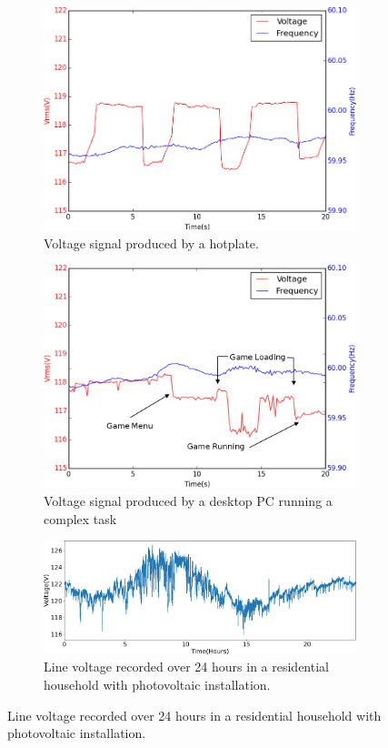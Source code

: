 \begin{figure}[h]
	\centering
	\begin{subfigure}{.5\textwidth}
	  \centering
	  \includegraphics[width=0.9\linewidth]{img/hotplate.png}
	  \caption{Voltage signal produced by a hotplate.}
	  \label{intro:fig1:sub1}
	\end{subfigure}%
	\begin{subfigure}{.5\textwidth}
	  \centering
	  \includegraphics[width=0.9\linewidth]{img/PC.png}
	  \caption{Voltage signal produced by a desktop PC running a complex task}
	  \label{intro:fig1:sub2}
	\end{subfigure}
	
	\begin{subfigure}{1\textwidth}
	  \centering
	  \includegraphics[width=0.9\linewidth]{img/johnson_daily.png}
	  \caption{Line voltage recorded over 24 hours in a residential household with photovoltaic installation.}
	  \label{intro:fig1:sub3}
	\end{subfigure}
	

\end{figure}
